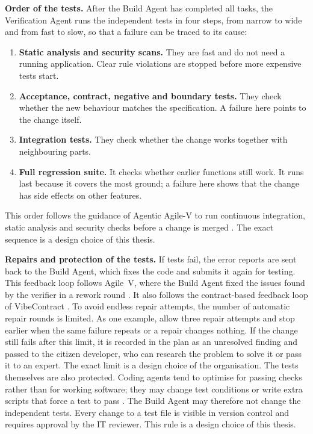 \documentclass[10pt,a4paper]{article}
\begin{document}
 
\textbf{Order of the tests.} After the Build Agent has completed all tasks,
the Verification Agent runs the independent tests in four steps, from narrow
to wide and from fast to slow, so that a failure can be traced to its cause:

\begin{enumerate}
    \item \textbf{Static analysis and security scans.} They are fast and do
    not need a running application. Clear rule violations are stopped before
    more expensive tests start.
    \item \textbf{Acceptance, contract, negative and boundary tests.} They
    check whether the new behaviour matches the specification. A failure
    here points to the change itself.
    \item \textbf{Integration tests.} They check whether the change works
    together with neighbouring parts.
    \item \textbf{Full regression suite.} It checks whether earlier functions
    still work. It runs last because it covers the most ground; a failure
    here shows that the change has side effects on other features.
\end{enumerate}

This order follows the guidance of Agentic Agile-V to run continuous
integration, static analysis and security checks before a change is merged
\parencite{koch2026agentic}. The exact sequence is a design choice of this
thesis.

\textbf{Repairs and protection of the tests.} If tests fail, the error
reports are sent back to the Build Agent, which fixes the code and submits it
again for testing. This feedback loop follows Agile~V, where the Build Agent
fixed the issues found by the verifier in a rework round
\parencite{koch2026agile}. It also follows the contract-based feedback loop of
VibeContract \parencite{wang2026vibecontract}. To avoid endless repair
attempts, the number of automatic repair rounds is limited. As one example,
\textcite{TODO-tddgovernance} allow three repair attempts and stop earlier when
the same failure repeats or a repair changes nothing. If the change still
fails after this limit, it is recorded in the plan as an unresolved finding
and passed to the citizen developer, who can research the problem to solve it
or pass it to an expert. The exact limit is a design choice of the
organisation. The tests themselves are also protected. Coding agents tend to
optimise for passing checks rather than for working software; they may change
test conditions or write extra scripts that force a test to pass
\parencite{TODO-kitchenloop}. The Build Agent may therefore not change the
independent tests. Every change to a test file is visible in version control
and requires approval by the IT reviewer. This rule is a design choice of
this thesis.
\end{document}
